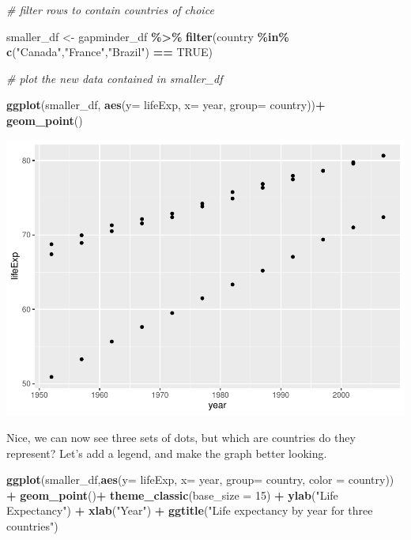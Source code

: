 \documentclass[
]{book}
\newenvironment{Shaded}{\begin{snugshade}}{\end{snugshade}}
\newcommand{\AttributeTok}[1]{\textcolor[rgb]{0.13,0.29,0.53}{#1}}
\newcommand{\CommentTok}[1]{\textcolor[rgb]{0.56,0.35,0.01}{\textit{#1}}}
\newcommand{\ConstantTok}[1]{\textcolor[rgb]{0.56,0.35,0.01}{#1}}
\newcommand{\DecValTok}[1]{\textcolor[rgb]{0.00,0.00,0.81}{#1}}
\newcommand{\FunctionTok}[1]{\textcolor[rgb]{0.13,0.29,0.53}{\textbf{#1}}}
\newcommand{\NormalTok}[1]{#1}
\newcommand{\OtherTok}[1]{\textcolor[rgb]{0.56,0.35,0.01}{#1}}
\newcommand{\SpecialCharTok}[1]{\textcolor[rgb]{0.81,0.36,0.00}{\textbf{#1}}}
\newcommand{\StringTok}[1]{\textcolor[rgb]{0.31,0.60,0.02}{#1}}
\begin{document}
\begin{Shaded}
\begin{Highlighting}[]
\CommentTok{\# filter rows to contain countries of choice}

\NormalTok{smaller\_df }\OtherTok{\textless{}{-}}\NormalTok{ gapminder\_df }\SpecialCharTok{\%\textgreater{}\%} 
                 \FunctionTok{filter}\NormalTok{(country }\SpecialCharTok{\%in\%} \FunctionTok{c}\NormalTok{(}\StringTok{"Canada"}\NormalTok{,}\StringTok{"France"}\NormalTok{,}\StringTok{"Brazil"}\NormalTok{) }\SpecialCharTok{==} \ConstantTok{TRUE}\NormalTok{)}

\CommentTok{\# plot the new data contained in smaller\_df}

\FunctionTok{ggplot}\NormalTok{(smaller\_df, }\FunctionTok{aes}\NormalTok{(}\AttributeTok{y=}\NormalTok{ lifeExp, }\AttributeTok{x=}\NormalTok{ year, }\AttributeTok{group=}\NormalTok{ country))}\SpecialCharTok{+}
  \FunctionTok{geom\_point}\NormalTok{()}
\end{Highlighting}
\end{Shaded}

\includegraphics{Statistics_Lab_files/figure-latex/1scatterC-1.pdf}

Nice, we can now see three sets of dots, but which are countries do they represent? Let's add a legend, and make the graph better looking.

\begin{Shaded}
\begin{Highlighting}[]
\FunctionTok{ggplot}\NormalTok{(smaller\_df,}\FunctionTok{aes}\NormalTok{(}\AttributeTok{y=}\NormalTok{ lifeExp, }\AttributeTok{x=}\NormalTok{ year, }
                      \AttributeTok{group=}\NormalTok{ country, }\AttributeTok{color =}\NormalTok{ country)) }\SpecialCharTok{+}
  \FunctionTok{geom\_point}\NormalTok{()}\SpecialCharTok{+} 
  \FunctionTok{theme\_classic}\NormalTok{(}\AttributeTok{base\_size =} \DecValTok{15}\NormalTok{) }\SpecialCharTok{+}
  \FunctionTok{ylab}\NormalTok{(}\StringTok{"Life Expectancy"}\NormalTok{) }\SpecialCharTok{+} 
  \FunctionTok{xlab}\NormalTok{(}\StringTok{"Year"}\NormalTok{) }\SpecialCharTok{+}
  \FunctionTok{ggtitle}\NormalTok{(}\StringTok{"Life expectancy by year for three countries"}\NormalTok{)}
\end{Highlighting}
\end{Shaded}
\end{document}
